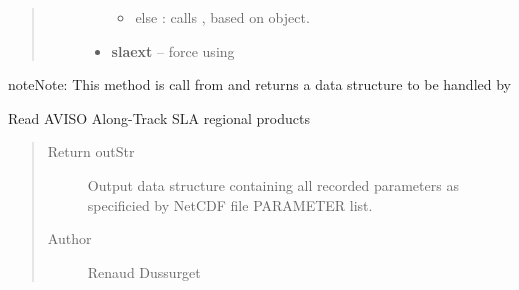 \documentclass[letterpaper,10pt,english]{sphinxmanual}
\begin{document}
\begin{fulllineitems}
\begin{fulllineitems}
\begin{quote}
\begin{description}
\begin{itemize}
\begin{itemize}
\item {} 
else : calls {\hyperref[altimetry.data:altimetry.data.alti_data.read_nc]{}}, based on {\hyperref[altimetry.tools.nctools:altimetry.tools.nctools.nc]{}} object.

\end{itemize}


\item {} 
\textbf{slaext} -- force using {\hyperref[altimetry.data:altimetry.data.alti_data.read_slaext]{}}

\end{itemize}

\end{description}\end{quote}

\begin{notice}{note}{Note:}
This method is call from {\hyperref[altimetry.data:altimetry.data.hydro_data.__init__]{}} and returns a data structure to be handled by {\hyperref[altimetry.data:altimetry.data.hydro_data.update_dataset]{}}
\end{notice}

\end{fulllineitems}


\begin{fulllineitems}
\label{altimetry.data:altimetry.data.alti_data.read_CTOH}
Read AVISO Along-Track SLA regional products
\begin{quote}\begin{description}
\item[{Return outStr}] \leavevmode
Output data structure containing all recorded parameters as specificied by NetCDF file PARAMETER list.

\item[{Author }] \leavevmode
Renaud Dussurget

\end{description}\end{quote}

\end{fulllineitems}


\end{fulllineitems}
\end{document}
